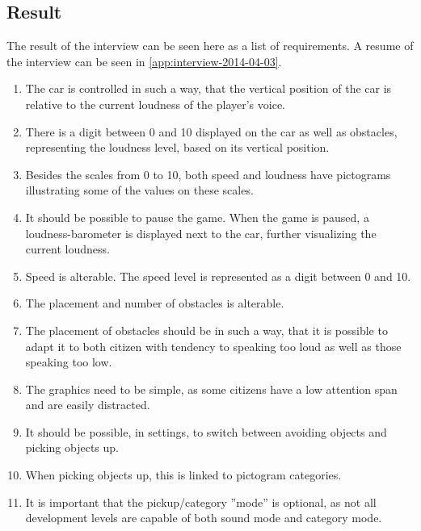\subsection{Result}
The result of the interview can be seen here as a list of requirements.
A resume of the interview can be seen in \cref{app:interview-2014-04-03}.

\begin{enumerate}
\item The car is controlled in such a way, that the vertical position of the car is relative to the current loudness of the player's voice.
\item There is a digit between 0 and 10 displayed on the car as well as obstacles, representing the loudness level, based on its vertical position. 
\item Besides the scales from 0 to 10, both speed and loudness have pictograms illustrating some of the values on these scales.
\item It should be possible to pause the game. When the game is paused, a loudness-barometer is displayed next to the car, further visualizing the current loudness.
\item Speed is alterable. The speed level is represented as a digit between 0 and 10.
\item The placement and number of obstacles is alterable.
\item The placement of obstacles should be in such a way, that it is possible to adapt it to both citizen with tendency to speaking too loud as well as those speaking too low.
\item The graphics need to be simple, as some citizens have a low attention span and are easily distracted.
\item It should be possible, in settings, to switch between avoiding objects and picking objects up.
\item When picking objects up, this is linked to pictogram categories.
\item It is important that the pickup/category ''mode'' is optional, as not all development levels are capable of both sound mode and category mode.
\end{enumerate}